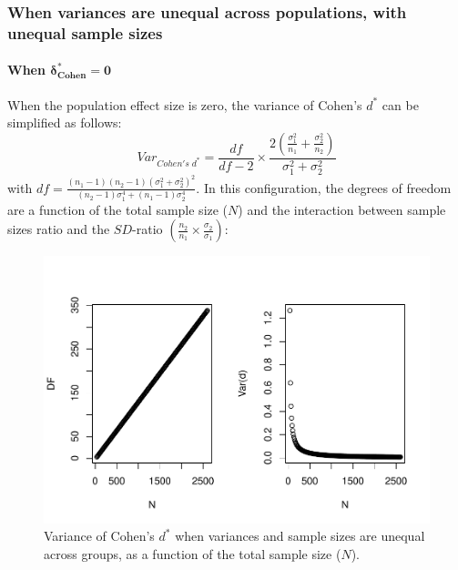 \documentclass[
  english,
  man,mask]{apa6}
\let\oldparagraph\paragraph
\renewcommand{\paragraph}[1]{\oldparagraph{#1}\mbox{}}
\begin{document}
\hypertarget{when-variances-are-unequal-across-populations-with-unequal-sample-sizes-1}{%
\subsubsection{When variances are unequal across populations, with unequal sample sizes}\label{when-variances-are-unequal-across-populations-with-unequal-sample-sizes-1}}

\hypertarget{when-bmdelta_cohen-0-2}{%
\paragraph{\texorpdfstring{When \(\bm{\delta^*_{Cohen} = 0}\)}{When \textbackslash bm\{\textbackslash delta\^{}*\_\{Cohen\} = 0\}}}\label{when-bmdelta_cohen-0-2}}

When the population effect size is zero, the variance of Cohen's \(d^*\) can be simplified as follows:
\[Var_{Cohen's \; d^*} = \frac{df}{df-2} \times \frac{2\left( \frac{\sigma^2_1}{n_1} + \frac{\sigma^2_2}{n_2} \right)}{\sigma^2_1+\sigma^2_2}\]
with \(df =\frac{(n_1-1)(n_2-1)(\sigma^2_1+\sigma^2_2)^2}{(n_2-1)\sigma_1^4+(n_1-1)\sigma_2^4}\). In this configuration, the degrees of freedom are a function of the total sample size (\(N\)) and the interaction between sample sizes ratio and the \(SD\)-ratio \(\left(\frac{n_2}{n_1}\times\frac{\sigma_2}{\sigma_1} \right)\):

\begin{figure}
\centering
\includegraphics{Theoretical-Variance-of-all-estimators-as-a-function-of-population-parameters_files/figure-latex/varcohendprimehetunbalNsize2-1.pdf}
\caption{\label{fig:varcohendprimehetunbalNsize2}Variance of Cohen's \(d^*\) when variances and sample sizes are unequal across groups, as a function of the total sample size (\(N\)).}
\end{figure}
\end{document}
